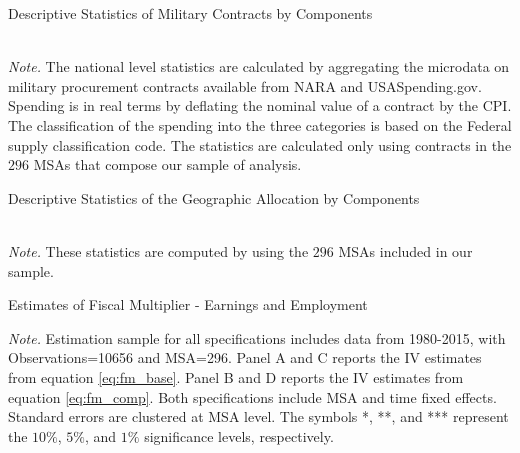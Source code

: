 \documentclass[dv_diss_main.tex]{subfiles}
\begin{document}
\begin{table}[H]
\begin{center}
    \caption{Descriptive Statistics of Military Contracts by Components}\label{tab:desstats_contracts}
	\resizebox{!}{!}{
    
    }
\end{center}
   \\
\footnotesize{\textit{Note.} The national level statistics are calculated by aggregating the microdata on military procurement contracts available from NARA and USASpending.gov. Spending is in real terms by deflating the nominal value of a contract by the CPI. The classification of the spending into the three categories is based on the Federal supply classification code. The statistics are calculated only using contracts in the $296$ MSAs that compose our sample of analysis.}

\end{table} 
\newpage

\begin{table}[H]
\begin{center}
    \caption{Descriptive Statistics of the Geographic Allocation by Components}
    \label{tab:desstats_cbsas}
	\resizebox{!}{!}{
    
    }
\end{center}
    \\
\footnotesize{\textit{Note. } These statistics are computed by using the $296$ MSAs included in our sample.}
\end{table} 
\newpage


\begin{table}[H]
    \begin{center}
      \caption{Estimates of Fiscal Multiplier - Earnings and Employment}
    \label{tab:fm_main}
	\resizebox*{\textwidth}{!}	{
    
    }  
    \end{center}
    \footnotesize{\textit{Note. }Estimation sample for all specifications includes data from 1980-2015, with Observations=10656 and MSA=296. Panel A and C reports the IV estimates from equation \eqref{eq:fm_base}. Panel B and D reports the IV estimates from equation \eqref{eq:fm_comp}. Both specifications include MSA and time fixed effects.  Standard errors are clustered at MSA level. The symbols *, **, and *** represent the $10\%$, $5\%$, and $1\%$ significance levels, respectively.}
\end{table}
\end{document}
